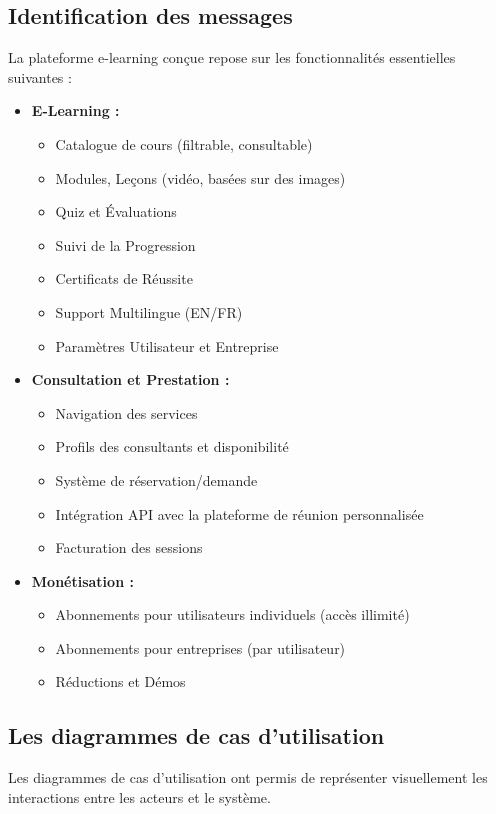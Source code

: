 \subsection{Identification des messages}
La plateforme e-learning conçue repose sur les fonctionnalités essentielles suivantes :
\begin{itemize}
    \item \textbf{E-Learning :}
    \begin{itemize}
        \item Catalogue de cours (filtrable, consultable)
        \item Modules, Leçons (vidéo, basées sur des images)
        \item Quiz et Évaluations
        \item Suivi de la Progression
        \item Certificats de Réussite
        \item Support Multilingue (EN/FR)
        \item Paramètres Utilisateur et Entreprise
    \end{itemize}
    \item \textbf{Consultation et Prestation :}
    \begin{itemize}
        \item Navigation des services
        \item Profils des consultants et disponibilité
        \item Système de réservation/demande
        \item Intégration API avec la plateforme de réunion personnalisée
        \item Facturation des sessions
    \end{itemize}
    \item \textbf{Monétisation :}
    \begin{itemize}
        \item Abonnements pour utilisateurs individuels (accès illimité)
        \item Abonnements pour entreprises (par utilisateur)
        \item Réductions et Démos
    \end{itemize}
\end{itemize}

\subsection{Les diagrammes de cas d'utilisation}
Les diagrammes de cas d'utilisation ont permis de représenter visuellement les interactions entre les acteurs et le système.

